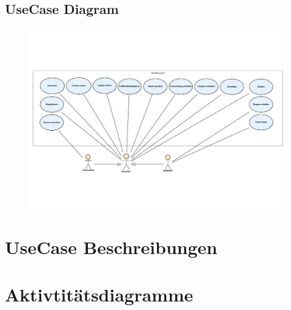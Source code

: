\documentclass[DIV=13, 10pt,a4paper]{scrartcl}
\begin{document}
\newpage
\begin{landscape}
	\thispagestyle{empty}
	\section{UseCase Diagram}
	\begin{figure}[h!]
		\centering
		\includegraphics[width=\textheight]{docs/1_UseCaseDiagramme/PrimaryUseCases.pdf}
		\label{fig:UCD}
	\end{figure}
	\restoregeometry
\end{landscape}

\newpage
\section{UseCase Beschreibungen}





\newpage
\section{Aktivtitätsdiagramme}




\end{document}
